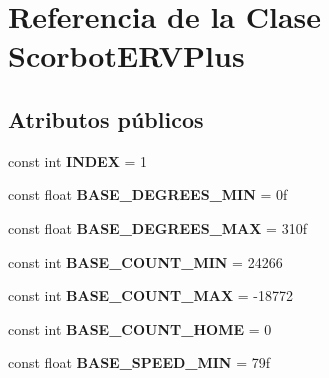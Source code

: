 \hypertarget{class_scorbot_e_r_v_plus}{}\section{Referencia de la Clase Scorbot\+E\+R\+V\+Plus}
\label{class_scorbot_e_r_v_plus}
\subsection*{Atributos públicos}
\begin{DoxyCompactItemize}
\item 
\mbox{\label{class_scorbot_e_r_v_plus_a39277ade90b7379615feb1d49b1595ff}} 
const int {\bfseries I\+N\+D\+EX} = 1
\item 
\mbox{\label{class_scorbot_e_r_v_plus_a83ed9065cb4e0f810ea9b232aeaa38c0}} 
const float {\bfseries B\+A\+S\+E\+\_\+\+D\+E\+G\+R\+E\+E\+S\+\_\+\+M\+IN} = 0f
\item 
\mbox{\label{class_scorbot_e_r_v_plus_ab465d61f3d062c26b194859a5bab41b7}} 
const float {\bfseries B\+A\+S\+E\+\_\+\+D\+E\+G\+R\+E\+E\+S\+\_\+\+M\+AX} = 310f
\item 
\mbox{\label{class_scorbot_e_r_v_plus_ac514e69b6ff313f215a800936dc50149}} 
const int {\bfseries B\+A\+S\+E\+\_\+\+C\+O\+U\+N\+T\+\_\+\+M\+IN} = 24266
\item 
\mbox{\label{class_scorbot_e_r_v_plus_afde727c33c8d0cc003b2f49ab536eba2}} 
const int {\bfseries B\+A\+S\+E\+\_\+\+C\+O\+U\+N\+T\+\_\+\+M\+AX} = -\/18772
\item 
\mbox{\label{class_scorbot_e_r_v_plus_ae7a67981cf8958d87b36aa8e47fbbf06}} 
const int {\bfseries B\+A\+S\+E\+\_\+\+C\+O\+U\+N\+T\+\_\+\+H\+O\+ME} = 0
\item 
\mbox{\label{class_scorbot_e_r_v_plus_af1ea7c400e83cdae45bca92c9cc2e6b1}} 
const float {\bfseries B\+A\+S\+E\+\_\+\+S\+P\+E\+E\+D\+\_\+\+M\+IN} = 79f
\item 
\mbox{\label{class_scorbot_e_r_v_plus_a92933bf3621669210a3ffb5bfa47674e}} 

\end{DoxyCompactItemize}
